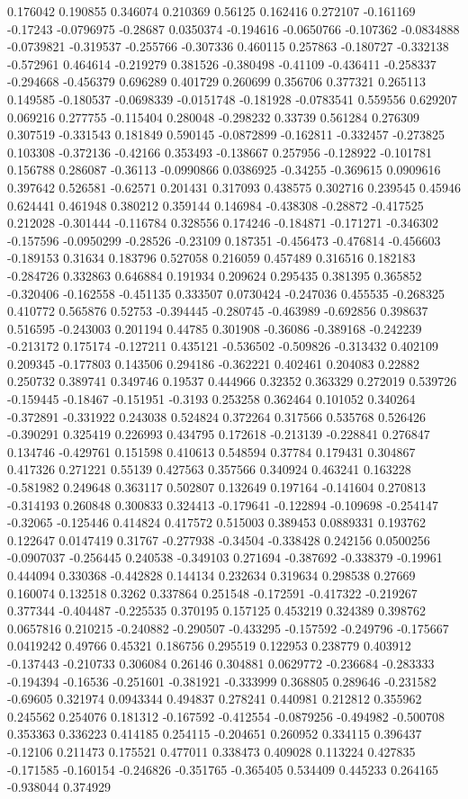 0.176042 0.190855 0.346074 0.210369 0.56125 0.162416 0.272107 -0.161169 -0.17243 -0.0796975 -0.28687 0.0350374 -0.194616 -0.0650766 -0.107362 -0.0834888 -0.0739821 -0.319537 -0.255766 -0.307336 0.460115 0.257863 -0.180727 -0.332138 -0.572961 0.464614 -0.219279 0.381526 -0.380498 -0.41109 -0.436411 -0.258337 -0.294668 -0.456379 0.696289 0.401729 0.260699 0.356706 0.377321 0.265113 0.149585 -0.180537 -0.0698339 -0.0151748 -0.181928 -0.0783541 0.559556 0.629207 0.069216 0.277755 -0.115404 0.280048 -0.298232 0.33739 0.561284 0.276309 0.307519 -0.331543 0.181849 0.590145 -0.0872899 -0.162811 -0.332457 -0.273825 0.103308 -0.372136 -0.42166 0.353493 -0.138667 0.257956 -0.128922 -0.101781 0.156788 0.286087 -0.36113 -0.0990866 0.0386925 -0.34255 -0.369615 0.0909616 0.397642 0.526581 -0.62571 0.201431 0.317093 0.438575 0.302716 0.239545 0.45946 0.624441 0.461948 0.380212 0.359144 0.146984 -0.438308 -0.28872 -0.417525 0.212028 -0.301444 -0.116784 0.328556 0.174246 -0.184871 -0.171271 -0.346302 -0.157596 -0.0950299 -0.28526 -0.23109 0.187351 -0.456473 -0.476814 -0.456603 -0.189153 0.31634 0.183796 0.527058 0.216059 0.457489 0.316516 0.182183 -0.284726 0.332863 0.646884 0.191934 0.209624 0.295435 0.381395 0.365852 -0.320406 -0.162558 -0.451135 0.333507 0.0730424 -0.247036 0.455535 -0.268325 0.410772 0.565876 0.52753 -0.394445 -0.280745 -0.463989 -0.692856 0.398637 0.516595 -0.243003 0.201194 0.44785 0.301908 -0.36086 -0.389168 -0.242239 -0.213172 0.175174 -0.127211 0.435121 -0.536502 -0.509826 -0.313432 0.402109 0.209345 -0.177803 0.143506 0.294186 -0.362221 0.402461 0.204083 0.22882 0.250732 0.389741 0.349746 0.19537 0.444966 0.32352 0.363329 0.272019 0.539726 -0.159445 -0.18467 -0.151951 -0.3193 0.253258 0.362464 0.101052 0.340264 -0.372891 -0.331922 0.243038 0.524824 0.372264 0.317566 0.535768 0.526426 -0.390291 0.325419 0.226993 0.434795 0.172618 -0.213139 -0.228841 0.276847 0.134746 -0.429761 0.151598 0.410613 0.548594 0.37784 0.179431 0.304867 0.417326 0.271221 0.55139 0.427563 0.357566 0.340924 0.463241 0.163228 -0.581982 0.249648 0.363117 0.502807 0.132649 0.197164 -0.141604 0.270813 -0.314193 0.260848 0.300833 0.324413 -0.179641 -0.122894 -0.109698 -0.254147 -0.32065 -0.125446 0.414824 0.417572 0.515003 0.389453 0.0889331 0.193762 0.122647 0.0147419 0.31767 -0.277938 -0.34504 -0.338428 0.242156 0.0500256 -0.0907037 -0.256445 0.240538 -0.349103 0.271694 -0.387692 -0.338379 -0.19961 0.444094 0.330368 -0.442828 0.144134 0.232634 0.319634 0.298538 0.27669 0.160074 0.132518 0.3262 0.337864 0.251548 -0.172591 -0.417322 -0.219267 0.377344 -0.404487 -0.225535 0.370195 0.157125 0.453219 0.324389 0.398762 0.0657816 0.210215 -0.240882 -0.290507 -0.433295 -0.157592 -0.249796 -0.175667 0.0419242 0.49766 0.45321 0.186756 0.295519 0.122953 0.238779 0.403912 -0.137443 -0.210733 0.306084 0.26146 0.304881 0.0629772 -0.236684 -0.283333 -0.194394 -0.16536 -0.251601 -0.381921 -0.333999 0.368805 0.289646 -0.231582 -0.69605 0.321974 0.0943344 0.494837 0.278241 0.440981 0.212812 0.355962 0.245562 0.254076 0.181312 -0.167592 -0.412554 -0.0879256 -0.494982 -0.500708 0.353363 0.336223 0.414185 0.254115 -0.204651 0.260952 0.334115 0.396437 -0.12106 0.211473 0.175521 0.477011 0.338473 0.409028 0.113224 0.427835 -0.171585 -0.160154 -0.246826 -0.351765 -0.365405 0.534409 0.445233 0.264165 -0.938044 0.374929 